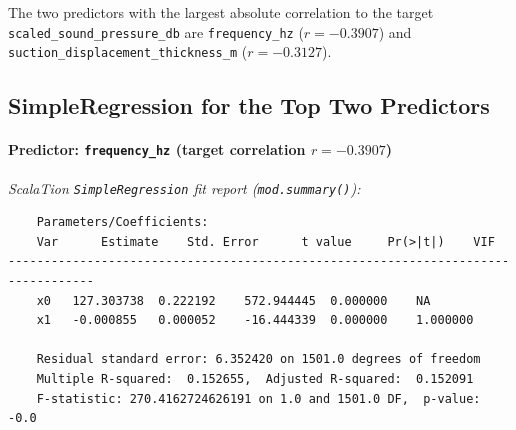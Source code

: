 \documentclass{article}
\begin{document}
The two predictors with the largest absolute correlation to the target \texttt{scaled\_sound\_pressure\_db} are \texttt{frequency\_hz} ($r=-0.3907$) and \texttt{suction\_displacement\_thickness\_m} ($r=-0.3127$).

\subsection{SimpleRegression for the Top Two Predictors}

\paragraph{Predictor: \texttt{frequency\_hz} (target correlation $r = -0.3907$)}

\textit{ScalaTion \texttt{SimpleRegression} fit report (\texttt{mod.summary()}):}
\begin{verbatim}
    Parameters/Coefficients:
    Var      Estimate    Std. Error 	 t value 	 Pr(>|t|) 	 VIF
----------------------------------------------------------------------------------
    x0	 127.303738	 0.222192	 572.944445	 0.000000	 NA
    x1	 -0.000855	 0.000052	 -16.444339	 0.000000	 1.000000

    Residual standard error: 6.352420 on 1501.0 degrees of freedom
    Multiple R-squared:  0.152655,	Adjusted R-squared:  0.152091
    F-statistic: 270.4162724626191 on 1.0 and 1501.0 DF,  p-value: -0.0
\end{verbatim}
\end{document}
